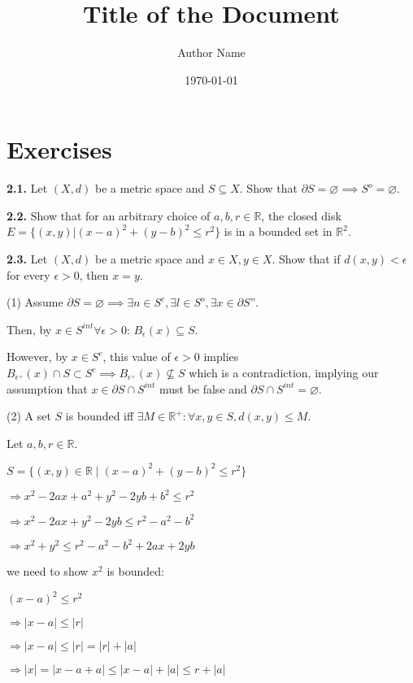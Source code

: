 \documentclass{article}
\title{\textbf{Title of the Document}}
\author{Author Name}
\date{\today}
\theoremstyle{definition}
\numberwithin{equation}{section}
\begin{document}
\maketitle
\tableofcontents
\newpage
\section{Exercises}
\textbf{2.1.} Let \((X,d)\) be a metric space and \(S \subseteq X\). Show that \( \partial S = \varnothing \implies S^o = \varnothing \).

\textbf{2.2.} Show that for an arbitrary choice of \(a, b, r \in \mathbb{R}\), the closed disk \(E = \{(x,y) | (x-a)^2 + (y - b)^2 \leq r^2\}\) is in a bounded set in \(\mathbb{R}^2\).

\textbf{2.3.} Let \((X, d)\) be a metric space and \(x \in X, y \in X\). Show that if \(d(x, y) < \epsilon\) for every \(\epsilon > 0\), then \(x = y\).

\noindent (1) Assume \( \partial S = \varnothing \implies \exists n \in S^c, \exists l \in S^o, \exists x \in \partial S \text{''} \). 

Then, by \( x \in S^{int} \forall \epsilon > 0 \): \( B_\epsilon (x) \subseteq S \).

However, by \( x \in S^c \), this value of \( \epsilon > 0 \) implies  
$ B_{\epsilon^+} (x) \cap S \subset S^c \implies B_{\epsilon^+} (x)  \nsubseteq S $
which is a contradiction, implying our assumption that \( x \in \partial S \cap S^{int} \) must be false and  
$ \partial S \cap S^{int} = \varnothing. $

\noindent (2) A set \( S \) is bounded iff \(\exists M \in \mathbb{R}^+ : \forall x, y \in S, d(x, y) \leq M \).

Let \( a, b, r \in \mathbb{R} \).

$ S = \{ (x, y) \in \mathbb{R} \mid (x - a)^2 + (y - b)^2 \leq r^2 \} $

$
\Rightarrow x^2 - 2ax + a^2 + y^2 - 2yb + b^2 \leq r^2 
$

$
\Rightarrow x^2 - 2ax + y^2 - 2yb \leq r^2 - a^2 - b^2
$

$ 
\Rightarrow x^2 + y^2 \leq r^2 - a^2 - b^2 + 2ax + 2yb 
$

we need to show \( x^2 \) is bounded:

$ (x - a)^2 \leq r^2 $

$
\Rightarrow |x - a| \leq |r|
$

$
\Rightarrow |x - a| \leq |r| = |r| + |a|
$

$
\Rightarrow |x| = |x - a + a| \leq |x - a| + |a| \leq r + |a|
 $
\end{document}
